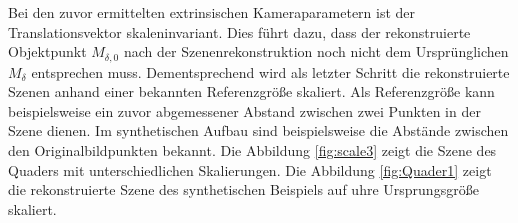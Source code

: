 Bei den zuvor ermittelten extrinsischen Kameraparametern ist der Translationsvektor skaleninvariant. Dies führt dazu, dass der rekonstruierte Objektpunkt $M_{\delta,0}$ nach der Szenenrekonstruktion noch nicht dem Ursprünglichen $M_\delta$ entsprechen muss. Dementsprechend wird als letzter Schritt die rekonstruierte Szenen anhand einer bekannten Referenzgröße skaliert. Als Referenzgröße kann beispielsweise ein zuvor abgemessener Abstand zwischen zwei Punkten in der Szene dienen. Im synthetischen Aufbau sind beispielsweise die Abstände zwischen den Originalbildpunkten bekannt. Die Abbildung \ref{fig:scale3} zeigt die Szene des Quaders mit unterschiedlichen Skalierungen. Die Abbildung \ref{fig:Quader1} zeigt die rekonstruierte Szene des synthetischen Beispiels auf uhre Ursprungsgröße skaliert.

%
%


